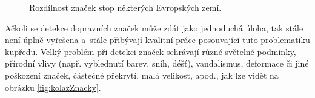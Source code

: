 \begin{figure}[H]
    \centering
    \hfill
    \hfill
    \hfill
    \hfill
    \caption{Rozdílnost značek stop některých Evropských zemí.\footnotemark}
    \label{kolazStopky}
\end{figure}


Ačkoli se detekce dopravních značek může zdát jako jednoduchá úloha, tak stále není úplně vyřešena a~stále přibývají kvalitní práce posouvající tuto problematiku kupředu. Velký problém při detekci značek sehrávají různé světelné podmínky, přírodní vlivy (např. vyblednutí barev, sníh, déšť), vandalismus, deformace či jiné poškození značek, částečné překrytí, malá velikost, apod., jak lze vidět na obrázku \ref{fig:kolazZnacky}.

